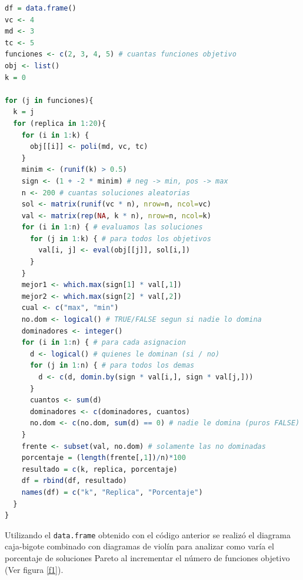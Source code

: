 \documentclass{article}
\begin{document}
\lstset{style=mystyle}
\begin{lstlisting}[language=R, caption= Fragmento del código modificado.]
df = data.frame()
vc <- 4
md <- 3
tc <- 5
funciones <- c(2, 3, 4, 5) # cuantas funciones objetivo
obj <- list()
k = 0

for (j in funciones){
  k = j
  for (replica in 1:20){
    for (i in 1:k) {
      obj[[i]] <- poli(md, vc, tc)
    }
    minim <- (runif(k) > 0.5)
    sign <- (1 + -2 * minim) # neg -> min, pos -> max
    n <- 200 # cuantas soluciones aleatorias
    sol <- matrix(runif(vc * n), nrow=n, ncol=vc)
    val <- matrix(rep(NA, k * n), nrow=n, ncol=k)
    for (i in 1:n) { # evaluamos las soluciones
      for (j in 1:k) { # para todos los objetivos
        val[i, j] <- eval(obj[[j]], sol[i,])
      }
    }
    mejor1 <- which.max(sign[1] * val[,1])
    mejor2 <- which.max(sign[2] * val[,2])
    cual <- c("max", "min")
    no.dom <- logical() # TRUE/FALSE segun si nadie lo domina
    dominadores <- integer()
    for (i in 1:n) { # para cada asignacion
      d <- logical() # quienes le dominan (si / no)
      for (j in 1:n) { # para todos los demas
        d <- c(d, domin.by(sign * val[i,], sign * val[j,]))
      }
      cuantos <- sum(d)
      dominadores <- c(dominadores, cuantos)
      no.dom <- c(no.dom, sum(d) == 0) # nadie le domina (puros FALSE)
    }
    frente <- subset(val, no.dom) # solamente las no dominadas
    porcentaje = (length(frente[,1])/n)*100
    resultado = c(k, replica, porcentaje)
    df = rbind(df, resultado)
    names(df) = c("k", "Replica", "Porcentaje")
  }
}
\end{lstlisting}

Utilizando el \texttt{data.frame} obtenido con el código anterior se realizó el diagrama caja-bigote combinado con diagramas de violín para analizar como varía el porcentaje de soluciones Pareto al incrementar el número de funciones objetivo (Ver figura \ref{f1}).  
\end{document}
